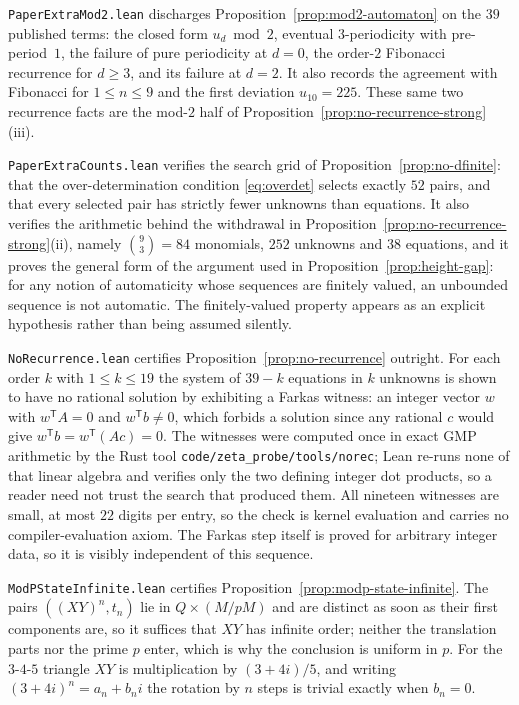 \documentclass[11pt,a4paper]{article}
\theoremstyle{remark}
\theoremstyle{plain}
\begin{document}
\texttt{PaperExtraMod2.lean} discharges Proposition~\ref{prop:mod2-automaton} on the $39$
published terms: the closed form $u_d \bmod 2$, eventual $3$-periodicity with pre-period~$1$,
the failure of pure periodicity at $d=0$, the order-$2$ Fibonacci recurrence for $d \ge 3$,
and its failure at $d=2$. It also records the agreement with Fibonacci for $1 \le n \le 9$ and
the first deviation $u_{10}=225$. These same two recurrence facts are the mod-$2$ half of
Proposition~\ref{prop:no-recurrence-strong}(iii).

\texttt{PaperExtraCounts.lean} verifies the search grid of
Proposition~\ref{prop:no-dfinite}: that the over-determination condition
\eqref{eq:overdet} selects exactly $52$ pairs, and that every selected pair has strictly
fewer unknowns than equations. It also verifies the arithmetic behind the withdrawal in
Proposition~\ref{prop:no-recurrence-strong}(ii), namely $\binom{9}{3}=84$ monomials, $252$
unknowns and $38$ equations, and it proves the general form of the argument used in
Proposition~\ref{prop:height-gap}: for any notion of automaticity whose sequences are finitely
valued, an unbounded sequence is not automatic. The finitely-valued property appears as an
explicit hypothesis rather than being assumed silently.

\texttt{NoRecurrence.lean} certifies Proposition~\ref{prop:no-recurrence} outright. For each
order $k$ with $1 \le k \le 19$ the system of $39-k$ equations in $k$ unknowns is shown to
have no rational solution by exhibiting a Farkas witness: an integer vector $w$ with
$w^{\mathsf{T}}A = 0$ and $w^{\mathsf{T}}b \neq 0$, which forbids a solution since any
rational $c$ would give $w^{\mathsf{T}}b = w^{\mathsf{T}}(Ac) = 0$. The witnesses were
computed once in exact GMP arithmetic by the Rust tool \texttt{code/zeta\_probe/tools/norec};
Lean re-runs none of that linear algebra and verifies only the two defining integer dot
products, so a reader need not trust the search that produced them. All nineteen witnesses
are small, at most $22$ digits per entry, so the check is kernel evaluation and carries no
compiler-evaluation axiom. The Farkas step itself is proved for arbitrary integer data, so it
is visibly independent of this sequence.

\texttt{ModPStateInfinite.lean} certifies Proposition~\ref{prop:modp-state-infinite}. The
pairs $((XY)^n, t_n)$ lie in $Q \times (M/pM)$ and are distinct as soon as their first
components are, so it suffices that $XY$ has infinite order; neither the translation parts
nor the prime $p$ enter, which is why the conclusion is uniform in $p$. For the $3$-$4$-$5$
triangle $XY$ is multiplication by $(3+4i)/5$, and writing $(3+4i)^n = a_n + b_n i$ the
rotation by $n$ steps is trivial exactly when $b_n = 0$.
\end{document}
